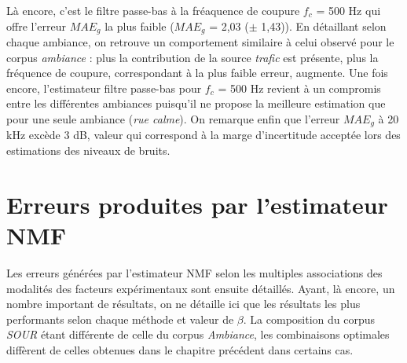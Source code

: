 Là encore, c'est le filtre passe-bas à la fréaquence de coupure $f_c$ = 500 Hz qui offre l'erreur $MAE_g$ la plus faible ($MAE_g$ = 2,03 ($\pm$ 1,43)).  En détaillant selon chaque ambiance, on retrouve un comportement similaire à celui observé pour le corpus \textit{ambiance} : plus la contribution de la source \textit{trafic} est présente, plus la fréquence de coupure, correspondant à la plus faible erreur, augmente. Une fois encore, l'estimateur filtre passe-bas pour $f_c$ = 500 Hz revient à un compromis entre les différentes ambiances puisqu'il ne propose la meilleure estimation que pour une seule ambiance (\textit{rue calme}).
On remarque enfin que l'erreur $MAE_g$ à 20 kHz excède 3 dB, valeur qui correspond à la marge d'incertitude acceptée lors des estimations des niveaux de bruits.

\section{Erreurs produites par l'estimateur NMF}
\label{chap:grafic_nmf}

Les erreurs générées par l'estimateur NMF selon les multiples associations des modalités des facteurs expérimentaux sont ensuite détaillés. Ayant, là encore, un nombre important de résultats, on ne détaille ici que les résultats les plus performants selon chaque méthode et valeur de $\beta$. La composition du corpus \textit{SOUR} étant différente de celle du corpus \textit{Ambiance}, les combinaisons optimales diffèrent de celles obtenues dans le chapitre précédent dans certains cas. 

